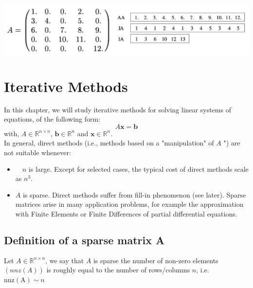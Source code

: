 \documentclass[11pt]{book}
\begin{document}
\begin{center}
\includegraphics[max width=\textwidth]{2023_09_05_b72ccc85584d9dc6fb5cg-026}
\end{center}

\newpage

\chapter{Iterative Methods}
In this chapter, we will study iterative methods for solving linear systems of equations, of the following form:
$$A \boldsymbol{x}=\boldsymbol{b}$$with, $A \in \mathbb{R}^{n \times n}$, $\boldsymbol{b} \in \mathbb{R}^{n}$ and $\boldsymbol{x} \in \mathbb{R}^{n}$.\\
In general, direct methods (i.e., methods based on a "manipulation" of $A$ ") are not suitable whenever:

\begin{itemize}
  \item $\quad n$ is large. Except for selected cases, the typical cost of direct methods scale as $n^{3}$.
  \item $A$ is sparse. Direct methods suffer from fill-in phenomenon (see later). Sparse matrices arise in many application problems, for example the approximation with Finite Elements or Finite Differences of partial differential equations.
\end{itemize}

\section*{Definition of a sparse matrix A}
Let $A \in \mathbb{R}^{n \times n}$, we say that $A$ is sparse the number of non-zero elements $(n n z(A))$ is roughly equal to the number of rows/columns $n$, i.e. $\mathrm{nnz}(\mathrm{A}) \sim n$
\end{document}
